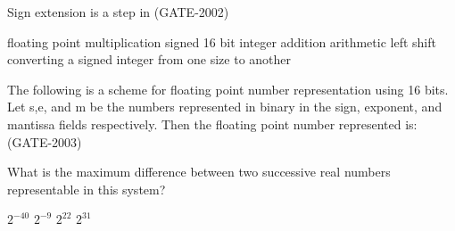 \begin{questyle}
  \question  Sign extension is a step in  (GATE-2002)

  \begin{choices}
    \choice         floating point multiplication
    \choice         signed 16 bit integer addition
    \choice         arithmetic left shift
    \CorrectChoice  converting a signed integer from one size to another
  \end{choices}
\end{questyle}

\begin{questyle}
  \question  The following is a scheme for floating point number representation using 16 bits.
             Let s,e, and m be the numbers represented in binary in the sign, exponent, and mantissa
             fields respectively. Then the floating point number represented is: (GATE-2003)

            \begin{center}  \end{center}

             What is the maximum difference between two successive real numbers representable in this system?
  \begin{oneparchoices}
    \choice         \(  2^{-40} \)
    \choice         \(  2^{-9} \)
    \CorrectChoice  \(  2^{22} \)
    \choice         \(  2^{31} \)
  \end{oneparchoices}
\end{questyle}

